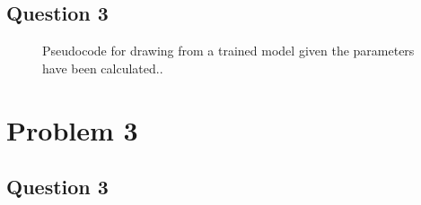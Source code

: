 \documentclass[12pt]{article} %
\begin{document}
\subsection{Question 3}
\begin{figure}[H]
	\vspace{-10mm}
	\caption{Pseudocode for drawing from a trained model given the parameters have been calculated..}
\end{figure}

\section{Problem 3}
\subsection{Question 3}
\begin{figure}[H]
	\vspace{-10mm}
\end{figure}
\end{document}
